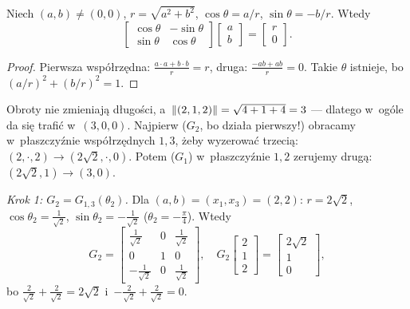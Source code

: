 \documentclass[11pt]{article}
\begin{document}
\begin{teoria}
\begin{lemat}\label{lem:givens}
Niech $(a,b)\ne(0,0)$, $r=\sqrt{a^2+b^2}$, $\cos\theta=a/r$,
$\sin\theta=-b/r$. Wtedy
\[
\begin{bmatrix}\cos\theta&-\sin\theta\\\sin\theta&\cos\theta\end{bmatrix}
\begin{bmatrix}a\\b\end{bmatrix}=\begin{bmatrix}r\\0\end{bmatrix}.
\]
\end{lemat}
\begin{proof}
Pierwsza współrzędna: $\frac{a\cdot a+b\cdot b}{r}=r$, druga:
$\frac{-ab+ab}{r}=0$. Takie $\theta$ istnieje, bo
$(a/r)^2+(b/r)^2=1$.
\end{proof}
\end{teoria}

\begin{intuicja}
Obroty nie zmieniają długości, a~$\left\lVert (2,1,2) \right\rVert=\sqrt{4+1+4}=3$ ---
dlatego w~ogóle da się trafić w~$(3,0,0)$. Najpierw ($G_2$, bo działa
pierwszy!) obracamy w~płaszczyźnie współrzędnych $1,3$, żeby wyzerować
trzecią: $(2,\cdot,2)\to(2\sqrt2,\cdot,0)$. Potem ($G_1$) w~płaszczyźnie
$1,2$ zerujemy drugą: $(2\sqrt2,1)\to(3,0)$.
\end{intuicja}

\formalnie
\emph{Krok 1: $G_2=G_{1,3}(\theta_2)$.} Dla $(a,b)=(x_1,x_3)=(2,2)$:
$r=2\sqrt2$, $\cos\theta_2=\frac1{\sqrt2}$, $\sin\theta_2=-\frac1{\sqrt2}$
($\theta_2=-\frac\pi4$). Wtedy
\[
G_2=\begin{bmatrix}\frac1{\sqrt2}&0&\frac1{\sqrt2}\\[2pt]0&1&0\\[2pt]
-\frac1{\sqrt2}&0&\frac1{\sqrt2}\end{bmatrix},\quad
G_2\begin{bmatrix}2\\1\\2\end{bmatrix}=\begin{bmatrix}2\sqrt2\\1\\0\end{bmatrix},
\]
bo $\frac2{\sqrt2}+\frac2{\sqrt2}=2\sqrt2$ i~$-\frac2{\sqrt2}+\frac2{\sqrt2}=0$.
\end{document}
